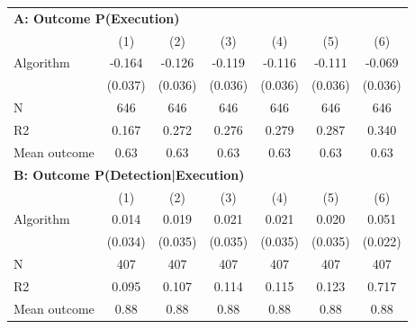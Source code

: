 \begin{tabular}{lcccccc} \toprule
\multicolumn{7}{l}{\textbf{A: Outcome P(Execution)}} \\ \multicolumn{1}{l}{} & (1) & (2) & (3) & (4) & (5) & (6) \\ \midrule
Algorithm   &      -0.164\sym{***}&      -0.126\sym{***}&      -0.119\sym{***}&      -0.116\sym{***}&      -0.111\sym{***}&      -0.069\sym{*}  \\
            &     (0.037)         &     (0.036)         &     (0.036)         &     (0.036)         &     (0.036)         &     (0.036)         \\
\midrule
N           &         646         &         646         &         646         &         646         &         646         &         646         \\
R2          &       0.167         &       0.272         &       0.276         &       0.279         &       0.287         &       0.340         \\
Mean outcome&        0.63         &        0.63         &        0.63         &        0.63         &        0.63         &        0.63         \\

\midrule \multicolumn{7}{l}{\textbf{B: Outcome P(Detection|Execution)}} \\ \multicolumn{1}{l}{} & (1) & (2) & (3) & (4) & (5) & (6) \\ \midrule
Algorithm   &       0.014         &       0.019         &       0.021         &       0.021         &       0.020         &       0.051\sym{**} \\
            &     (0.034)         &     (0.035)         &     (0.035)         &     (0.035)         &     (0.035)         &     (0.022)         \\
\midrule
N           &         407         &         407         &         407         &         407         &         407         &         407         \\
R2          &       0.095         &       0.107         &       0.114         &       0.115         &       0.123         &       0.717         \\
Mean outcome&        0.88         &        0.88         &        0.88         &        0.88         &        0.88         &        0.88         \\


\end{tabular}
